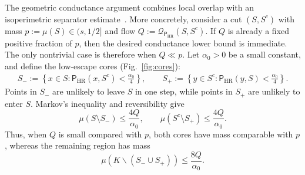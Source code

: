 \documentclass[11pt]{article}
\theoremstyle{definition}
\theoremstyle{remark}
\newcommand{\cQ}{\mathcal Q}
\newcommand{\HR}{\mathsf P_{\mathrm{HR}}}
\begin{document}
The geometric conductance argument combines local overlap with an isoperimetric separator estimate~\cite{LS,LV,VempalaSurvey}.  More concretely, consider a cut $(S,S^c)$ with mass $p:=\mu(S)\in(s,1/2]$ and flow $Q:=\cQ_{\HR}(S,S^c)$. If $Q$ is already a fixed positive fraction of $p$, then the desired conductance lower bound is immediate.  The only nontrivial case is therefore when $Q\ll p$.  Let $\alpha_0>0$ be a small constant, and define the low-escape cores (Fig.~\ref{fig:cores}):
\begin{align}\label{eq:intro_def_S}
 S_-:=
 \left\{
 x\in S:
 \HR(x,S^c)<\frac{\alpha_0}{4}
 \right\},
 \qquad
 S_+:=
 \left\{
 y\in S^c:
 \HR(y,S)<\frac{\alpha_0}{4}
 \right\}.
\end{align}
Points in $S_-$ are unlikely to leave $S$ in one step, while points in
$S_+$ are unlikely to enter $S$.  Markov's inequality and reversibility give
\[
 \mu(S\setminus S_-)
 \le\frac{4Q}{\alpha_0},
 \qquad
 \mu(S^c\setminus S_+)
 \le\frac{4Q}{\alpha_0}.
\]
Thus, when $Q$ is small compared with $p$, both cores have mass comparable with $p$, whereas the remaining region has mass
\begin{equation}\label{eq:intro-separator-upper}
 \mu(K\backslash (S_-\cup S_+))\le\frac{8Q}{\alpha_0}.
\end{equation}
\end{document}
